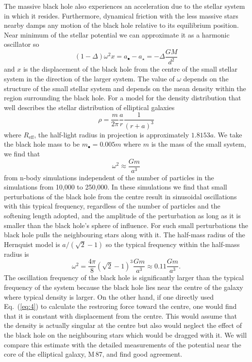 \documentclass[useAMS,usenatbib]{mn2e}
\begin{document}
The massive black hole also experiences an acceleration due to the
stellar system in which it resides.  Furthermore, dynamical friction
with the less massive stars nearby damps any motion of the black hole
relative to its equilibrium position.  Near minimum of the stellar
potential we can approximate it as a harmonic oscillator so
\begin{equation}
  \left (1 - \Delta \right) \omega^2 x
   = a_\bullet - a_\star = -\Delta \frac{GM}{d^2}
  \label{eq:3}
\end{equation}
and $x$ is the displacement of the black hole from the centre of the
small stellar system in the direction of the larger system.  The value
of $\omega$ depends on the structure of the small stellar system and
depends on the mean density within the region surrounding the black
hole.  For a \citet{1990ApJ...356..359H} model
for the density distribution that well describes the stellar
distribution of elliptical galaxies
\begin{equation}
  \rho = \frac{m}{2\pi} \frac{a}{r} \frac{1}{(r+a)^3}
  \label{eq:4}
\end{equation}
where $R_\mathrm{eff}$, the half-light radius in projection is
approximately $1.8153 a$.  We take the black hole mass to be
$m_\bullet = 0.005 m$ where $m$ is the mass of the small system, we
find that
\begin{equation}
  \omega^2 \approx \frac{Gm}{a^3}
  \label{eq:5}
\end{equation}
from n-body simulations independent of the number of particles in the
simulations from 10,000 to 250,000.  In these simulations we find that
small perturbations of the black hole from the centre result in
sinusoidal oscillations with this typical frequency, regardless of the
number of particles and the softening length adopted, and the
amplitude of the perturbation as long as it is smaller than the black
hole's sphere of influence.  For such small perturbations the black
hole pulls the neighbouring stars along with it. The half-mass radius
of the Hernquist model is $a/(\sqrt{2}-1)$ so the typical frequency
within the half-mass radius is
\begin{equation}
  \omega^2 = \frac{4\pi}{8} (\sqrt{2}-1)^3 \frac{G m}{a^3} \approx
  0.11 \frac{Gm}{a^3}.
  \label{eq:6}
\end{equation}
The oscillation frequency of the black hole is significantly larger
than the typical frequency of the system because the black hole lies
near the centre of the galaxy where typical density is larger.  On the
other hand, if one directly used Eq.~(\ref{eq:4}) to calculate the
restroring force toward the centre, one would find that it is constant
with displacement from the centre.  This would assume that the density
is actually singular at the centre but also would neglect the effect
of the black hole on the neighbouring stars which would be dragged
with it.  We will compare this estimate with the detailed
measurements of the potential near the core of the elliptical galaxy,
M\,87, and find good agreement.
\end{document}
